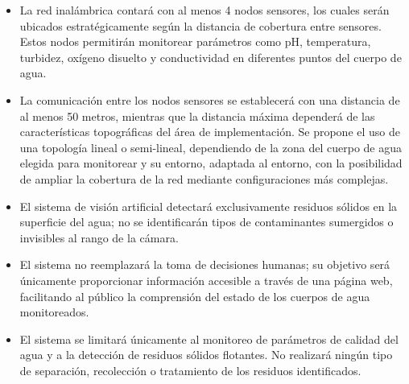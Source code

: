 \begin{itemize}

    \item La red inalámbrica contará con al menos 4 nodos sensores, los cuales serán ubicados estratégicamente según la distancia de cobertura entre sensores. Estos nodos permitirán monitorear parámetros como pH, temperatura, turbidez, oxígeno disuelto y conductividad en diferentes puntos del cuerpo de agua.

    \item La comunicación entre los nodos sensores se establecerá con una distancia de al menos 50 metros, mientras que la distancia máxima dependerá de las características topográficas del área de implementación. Se propone el uso de una topología lineal o semi-lineal, dependiendo de la zona del cuerpo de agua elegida para monitorear y su entorno, adaptada al entorno, con la posibilidad de ampliar la cobertura de la red mediante configuraciones más complejas.
    
    \item El sistema de visión artificial detectará exclusivamente residuos sólidos en la superficie del agua; no se identificarán tipos de contaminantes sumergidos o invisibles al rango de la cámara.
    
    \item El sistema no reemplazará la toma de decisiones humanas; su objetivo será únicamente proporcionar información accesible a través de una página web, facilitando al público la comprensión del estado de los cuerpos de agua monitoreados.
    \item El sistema se limitará únicamente al monitoreo de parámetros de calidad del agua y a la detección de residuos sólidos flotantes. No realizará ningún tipo de separación, recolección o tratamiento de los residuos identificados.

\end{itemize}
